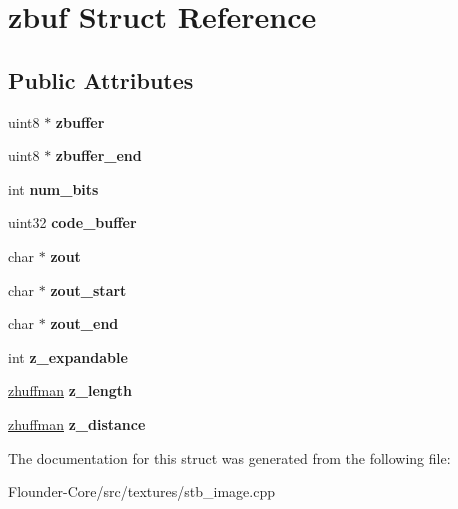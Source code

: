 \hypertarget{structzbuf}{}\section{zbuf Struct Reference}
\label{structzbuf}
\subsection*{Public Attributes}
\begin{DoxyCompactItemize}
\item 
\mbox{\label{structzbuf_a7080eb91dcc67e1dfe818d08e6f22c4e}} 
uint8 $\ast$ {\bfseries zbuffer}
\item 
\mbox{\label{structzbuf_af030baa17bebedd18272678da17a33f4}} 
uint8 $\ast$ {\bfseries zbuffer\+\_\+end}
\item 
\mbox{\label{structzbuf_acd069cdb4100884a732ad2794edbbdff}} 
int {\bfseries num\+\_\+bits}
\item 
\mbox{\label{structzbuf_a3bb8244d7be17801079c5a8587182edb}} 
uint32 {\bfseries code\+\_\+buffer}
\item 
\mbox{\label{structzbuf_aaf137c25fa5b9fb14e92354da4203c38}} 
char $\ast$ {\bfseries zout}
\item 
\mbox{\label{structzbuf_af31571e8d74c78c9bb18d92205150b28}} 
char $\ast$ {\bfseries zout\+\_\+start}
\item 
\mbox{\label{structzbuf_af07c0b7b7227f670ee1413bc0dcab791}} 
char $\ast$ {\bfseries zout\+\_\+end}
\item 
\mbox{\label{structzbuf_ae662f24e0973ca19b543e64647a6bfb6}} 
int {\bfseries z\+\_\+expandable}
\item 
\mbox{\label{structzbuf_a5906bdbe9dfb565339acac51af9efe89}} 
\hyperlink{structzhuffman}{zhuffman} {\bfseries z\+\_\+length}
\item 
\mbox{\label{structzbuf_ae7d9588b2548708e14f3c6ad89bf26b5}} 
\hyperlink{structzhuffman}{zhuffman} {\bfseries z\+\_\+distance}
\end{DoxyCompactItemize}


The documentation for this struct was generated from the following file\+:\begin{DoxyCompactItemize}
\item 
Flounder-\/\+Core/src/textures/stb\+\_\+image.\+cpp\end{DoxyCompactItemize}
